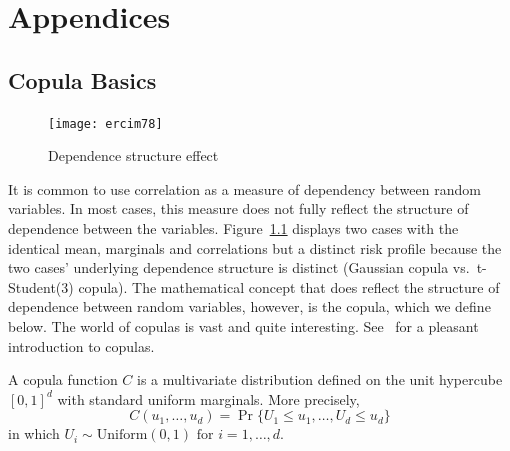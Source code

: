 \documentclass[11pt,fleqn]{book} %
\begin{document}
\appendix
\chapter{Appendices}

\section{Copula Basics}
\label{ap:copula_basics}

\begin{figure}
	\vspace{-25pt}
	\begin{center}
		\texttt{[image: ercim78]}
	\end{center}
	\vspace{-10pt}
	\caption{Dependence structure effect}
	\vspace{-10pt}
	\label{fig:copula_effect}
\end{figure}
It is common to use correlation as a measure of dependency between random 
variables. In most cases, this measure does not fully reflect the structure 
of dependence between the variables. Figure~\ref{fig:copula_effect} displays 
two cases with the identical mean, marginals and correlations but a distinct 
risk profile because the two cases' underlying  dependence structure is 
distinct (Gaussian copula vs.\ t-Student(3) copula). The mathematical concept 
that does reflect the structure of dependence between random variables, 
however, is the copula, which we define below. The world of copulas is vast 
and quite interesting. See~\cite[chap. 5]{mcneil:2005} for a pleasant 
introduction to copulas.

\begin{definition}[Copula]
	A copula function $C$ is a multivariate distribution defined on the 
	unit hypercube $[0,1]^d$ with standard uniform marginals. 
	More precisely,
	\begin{displaymath}
		C(u_1, \dots, u_d) = \Pr\{U_1 \le u_1, \dots, U_d \le u_d\}
	\end{displaymath}
	in which $U_i \sim \text{Uniform}(0,1) \text{ for } i = 1,\dots, d$.
\end{definition}
\end{document}
